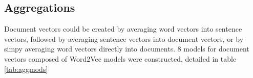 \subsection{Aggregations}
Document vectors could be created by averaging word vectors into sentence vectors, followed by averaging sentence vectors into document vectors, or by simpy averaging word vectors directly into documents. 8 models for document vectors composed of Word2Vec models were constructed, detailed in table \ref{tab:aggmods}
\newpage
\null
\newpage
